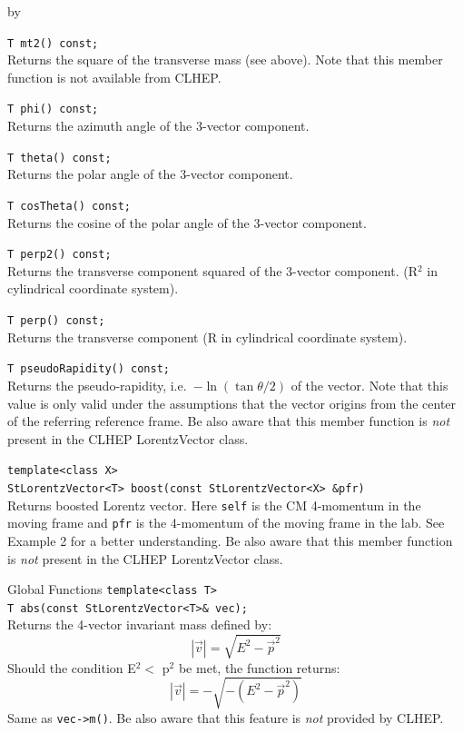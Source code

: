 \documentclass[twoside]{article}
\newcommand{\comp}[1]{\texttt{#1}}%
\newcommand{\entrylabel}[1]{\mbox{\textbf{{#1}}}\hfil}%
\newenvironment{entry}
{\begin{list}{}%
    {\renewcommand{\makelabel}{\entrylabel}%
     \setlength{\labelwidth}{90pt}%
     \setlength{\leftmargin}{\labelwidth}
     \advance\leftmargin by \labelsep%
      }%
    }%
  {\end{list}}
\newcommand{\Entrylabel}[1]%
{\raisebox{0pt}[1ex][0pt]{\makebox[\labelwidth][l]%
    {\parbox[t]{\labelwidth}{\hspace{0pt}\textbf{{#1}}}}}}
\newenvironment{Entry}%
{\renewcommand{\entrylabel}{\Entrylabel}\begin{entry}}%
  {\end{entry}}
\begin{document}
\begin{Entry}
    \verb+T mt2() const;+\\    
    Returns the square of the transverse mass (see above).
    Note that this member function is not available
    from CLHEP.
    
    \verb+T phi() const;+\\
    Returns the azimuth angle of the 3-vector component.
    
    \verb+T theta() const;+\\
    Returns the polar angle of the 3-vector component.
    
    \verb+T cosTheta() const;+\\
    Returns the cosine of the polar angle of the 3-vector component.
       
    \verb+T perp2() const;+\\
    Returns the transverse component squared of the 3-vector component.
    (R$^2$ in cylindrical coordinate system).
    
    \verb+T perp() const;+\\
    Returns the transverse component
    (R in cylindrical coordinate system). 
    
    \verb+T pseudoRapidity() const;+\\
    Returns the pseudo-rapidity, i.e.~$-\ln(\tan \theta/2)$ of the
    vector. Note that this value is only valid under the assumptions
    that the vector origins from the center of the referring
    reference frame. Be also aware that this member function is
    {\em not} present in the CLHEP LorentzVector class.

    \verb+template<class X>+\\
    \verb+StLorentzVector<T> boost(const StLorentzVector<X> &pfr)+\\  
    Returns boosted Lorentz vector.
    Here \comp{self} is the CM 4-momentum in the moving frame and
    \comp{pfr} is the 4-momentum of the moving frame in the lab.
    See Example 2 for a better understanding.    
    Be also aware that this member function is
    {\em not} present in the CLHEP LorentzVector class.
    
\item[Global Functions]
    \verb+template<class T>+\\
    \verb+T abs(const StLorentzVector<T>& vec);+\\ 
    Returns the 4-vector invariant mass defined
    by:
    \begin{equation*}
      |\vec{v}| = \sqrt{E^{2} - \vec{p}^{2}}
    \end{equation*}
    Should the condition E$^{2} < $ p$^{2}$ be met, the
    function returns:
   \begin{equation*}
      |\vec{v}| = -\sqrt{-(E^{2} - \vec{p}^{2})}
    \end{equation*}
    Same as
    \verb+vec->m()+.
    Be also aware that this feature is {\em not} provided by
    CLHEP.
    

\end{Entry}
\end{document}
